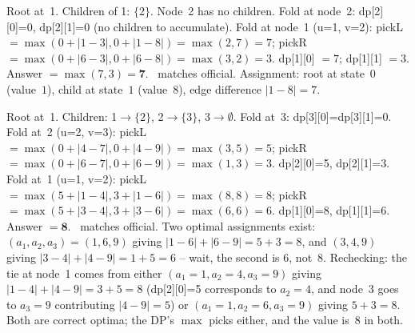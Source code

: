 \begin{tracebox}[Sample~1: $n=2$, ranges $(1,6)$ and $(3,8)$, edge $1\!-\!2$]
Root at~1. Children of 1: $\{2\}$. Node~2 has no children.
Fold at node~2: dp[2][0]=0, dp[2][1]=0 (no children to accumulate).
Fold at node~1 (u=1, v=2): pickL $=\max(0+|1-3|,0+|1-8|)=\max(2,7)=7$;
pickR $=\max(0+|6-3|,0+|6-8|)=\max(3,2)=3$.
dp[1][0] $=7$; dp[1][1] $=3$.
Answer $=\max(7,3)=\mathbf{7}$. \checkmark\ matches official.
Assignment: root at state~$0$ (value~$1$), child at state~$1$ (value~$8$),
edge difference $|1-8|=7$.
\end{tracebox}

\begin{tracebox}[Sample~2: $n=3$, ranges $(1,3),(4,6),(7,9)$, edges $1\!-\!2$ and $2\!-\!3$]
Root at~1. Children: 1$\to$$\{2\}$, 2$\to$$\{3\}$, 3$\to\emptyset$.
Fold at~3: dp[3][0]=dp[3][1]=0.
Fold at~2 (u=2, v=3): pickL $=\max(0+|4-7|,0+|4-9|)=\max(3,5)=5$;
pickR $=\max(0+|6-7|,0+|6-9|)=\max(1,3)=3$.
dp[2][0]=5, dp[2][1]=3.
Fold at~1 (u=1, v=2): pickL $=\max(5+|1-4|,3+|1-6|)=\max(8,8)=8$;
pickR $=\max(5+|3-4|,3+|3-6|)=\max(6,6)=6$.
dp[1][0]=8, dp[1][1]=6. Answer $=\mathbf{8}$. \checkmark\ matches official.
Two optimal assignments exist: $(a_1,a_2,a_3)=(1,6,9)$ giving $|1-6|+|6-9|=5+3=8$,
and $(3,4,9)$ giving $|3-4|+|4-9|=1+5=6$ -- wait, the second is $6$, not~$8$.
Rechecking: the tie at node~1 comes from either $(a_1=1,a_2=4,a_3=9)$
giving $|1-4|+|4-9|=3+5=8$ (dp[2][0]=5 corresponds to $a_2=4$, and node~3
goes to $a_3=9$ contributing $|4-9|=5$) or $(a_1=1,a_2=6,a_3=9)$ giving
$5+3=8$. Both are correct optima; the DP's $\max$ picks either, and the
value is~$8$ in both. \checkmark
\end{tracebox}

